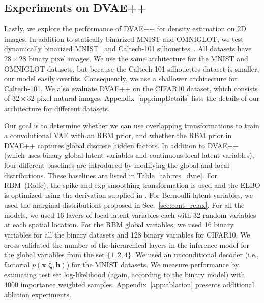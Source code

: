 \documentclass{article}
\newcommand{\x}{{\pmb{x}}}
\newcommand{\h}{{\pmb{h}}}
\newcommand{\bzeta}{{\pmb{\zeta}}}
\begin{document}
\subsection{Experiments on DVAE++} \label{sec:dvae_expr}

Lastly, we explore the performance of DVAE++ for density estimation on 2D images. In addition to statically binarized MNIST and 
OMNIGLOT, we test dynamically binarized MNIST~\cite{lecun1998gradient}
and Caltech-101 silhouettes~\cite{marlin2010inductive}. 
All datasets have $28\times28$ binary pixel images. We use the same architecture for
the MNIST and OMNIGLOT datasets, but because the Caltech-101 silhouettes dataset 
is smaller, our model easily overfits. Consequently, we use a shallower architecture for Caltech-101.
We also evaluate DVAE++ on the CIFAR10 dataset, which consists of $32\times32$ pixel natural images. 
Appendix~\ref{app:impDetails} lists the details of our architecture for different datasets.

Our goal is to determine whether we can use overlapping transformations to train a convolutional VAE with an RBM prior, and whether
the RBM prior in DVAE++ captures global discrete hidden factors.
In addition to DVAE++ (which uses binary global latent variables and continuous local latent variables), four different 
baselines are introduced by modifying the global and local distributions.
These baselines are listed in Table~\ref{tab:res_dvae}. For RBM~(Rolfe), the spike-and-exp smoothing transformation
is used and the ELBO is optimized using the derivation supplied in \cite{rolfe2016discrete}. For Bernoulli latent variables, we used
the marginal distributions proposed in Sec.~\ref{sec:cont_relax}.
For all the models, we used 16 layers of local latent variables each with 32 random variables at each spatial location.
For the RBM global variables, we used 16 binary variables for all the binary datasets and 
128 binary variables for CIFAR10. We cross-validated the number of the hierarchical layers 
in the inference model for the global variables from the set $\{1, 2, 4\}$. We used an unconditional decoder 
(i.e., factorial $p(\x|\bzeta, \h)$) for the MNIST datasets. 
We measure performance by estimating test set log-likelihood (again, according to the binary model) with 4000 importance weighted samples.
Appendix~\ref{app:ablation} presents additional ablation experiments. 
\end{document}
